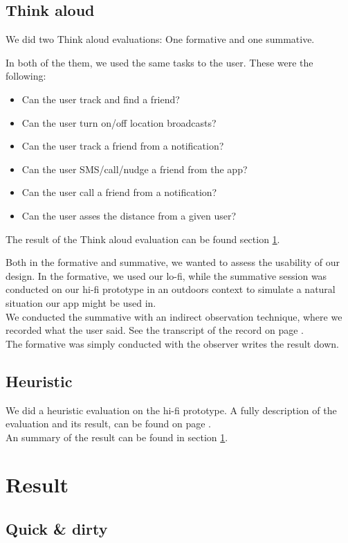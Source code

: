 \documentclass[runningheads,a4paper]{llncs}
\begin{document}
\subsection*{Think aloud}
We did two Think aloud evaluations: One formative and one summative.

In both of the them, we used the same tasks to the user. These were the following: 

\begin{itemize}
\item Can the user track and find a friend? 
\item Can the user turn on/off location broadcasts? 
\item Can the user track a friend from a notification?
\item Can the user SMS/call/nudge a friend from the app?
\item Can the user call a friend from a notification?
\item Can the user asses the distance from a given user?
\end{itemize}
The result of the Think aloud evaluation can be found section \ref{result}. 

Both in the formative and summative, we wanted to assess the usability of our design. In the formative, we used our lo-fi, while the summative session was conducted on our hi-fi prototype in an outdoors context to simulate a natural situation our app might be used in.\\
We conducted the summative with an indirect observation technique, where we recorded what the user said. See the transcript of the record on page \pageref{transcript}. \\
The formative was simply conducted with the observer writes the result down. 


\subsection*{Heuristic}
We did a heuristic evaluation on the hi-fi prototype. A fully description of the evaluation and its result, can be found on page \pageref{heuristic}. \\
An summary of the result can be found in section \ref{result}.
\section{Result}\label{result}
\subsection*{Quick \& dirty}
\end{document}
